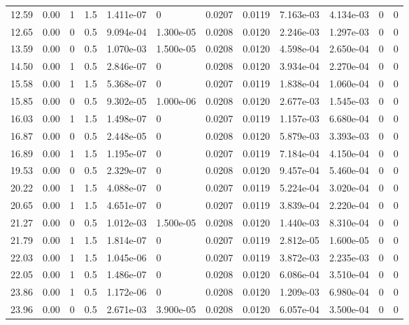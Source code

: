 \documentclass[preview]{standalone}
\begin{document}
{{\begin{tabular}{L{1.2cm}C{1.2cm} C{0.3cm}C{0.5cm} C{1.4cm}C{1.4cm} C{1.4cm}C{1.4cm} C{1.6cm}C{1.6cm} C{1.6cm}C{1.6cm}}
  12.59  &  0.00  & 1     & 1.5 &  1.411e-07  & 0  &  0.0207&   0.0119& 7.163e-03 & 4.134e-03   &  0 & 0  \\ 
  12.65  &  0.00  & 0     & 0.5 &  9.094e-04  & 1.300e-05  &  0.0208&   0.0120& 2.246e-03 & 1.297e-03   &  0 & 0  \\ 
  13.59  &  0.00  & 0     & 0.5 &  1.070e-03  & 1.500e-05  &  0.0208&   0.0120& 4.598e-04 & 2.650e-04   &  0 & 0  \\ 
  14.50  &  0.00  & 1     & 0.5 &  2.846e-07  & 0  &  0.0208&   0.0120& 3.934e-04 & 2.270e-04   &  0 & 0  \\ 
  15.58  &  0.00  & 1     & 1.5 &  5.368e-07  & 0  &  0.0207&   0.0119& 1.838e-04 & 1.060e-04   &  0 & 0  \\ 
  15.85  &  0.00  & 0     & 0.5 &  9.302e-05  & 1.000e-06  &  0.0208&   0.0120& 2.677e-03 & 1.545e-03   &  0 & 0  \\ 
  16.03  &  0.00  & 1     & 1.5 &  1.498e-07  & 0  &  0.0207&   0.0119& 1.157e-03 & 6.680e-04   &  0 & 0  \\ 
  16.87  &  0.00  & 0     & 0.5 &  2.448e-05  & 0  &  0.0208&   0.0120& 5.879e-03 & 3.393e-03   &  0 & 0  \\ 
  16.89  &  0.00  & 1     & 1.5 &  1.195e-07  & 0  &  0.0207&   0.0119& 7.184e-04 & 4.150e-04   &  0 & 0  \\ 
  19.53  &  0.00  & 0     & 0.5 &  2.329e-07  & 0  &  0.0208&   0.0120& 9.457e-04 & 5.460e-04   &  0 & 0  \\ 
  20.22  &  0.00  & 1     & 1.5 &  4.088e-07  & 0  &  0.0207&   0.0119& 5.224e-04 & 3.020e-04   &  0 & 0  \\ 
  20.65  &  0.00  & 1     & 1.5 &  4.651e-07  & 0  &  0.0207&   0.0119& 3.839e-04 & 2.220e-04   &  0 & 0  \\ 
  21.27  &  0.00  & 0     & 0.5 &  1.012e-03  & 1.500e-05  &  0.0208&   0.0120& 1.440e-03 & 8.310e-04   &  0 & 0  \\ 
  21.79  &  0.00  & 1     & 1.5 &  1.814e-07  & 0  &  0.0207&   0.0119& 2.812e-05 & 1.600e-05   &  0 & 0  \\ 
  22.03  &  0.00  & 1     & 1.5 &  1.045e-06  & 0  &  0.0207&   0.0119& 3.872e-03 & 2.235e-03   &  0 & 0  \\ 
  22.05  &  0.00  & 1     & 0.5 &  1.486e-07  & 0  &  0.0208&   0.0120& 6.086e-04 & 3.510e-04   &  0 & 0  \\ 
  23.86  &  0.00  & 1     & 0.5 &  1.172e-06  & 0  &  0.0208&   0.0120& 1.209e-03 & 6.980e-04   &  0 & 0  \\ 
  23.96  &  0.00  & 0     & 0.5 &  2.671e-03  & 3.900e-05  &  0.0208&   0.0120& 6.057e-04 & 3.500e-04   &  0 & 0  \\ 

\end{tabular}}}
\end{document}
